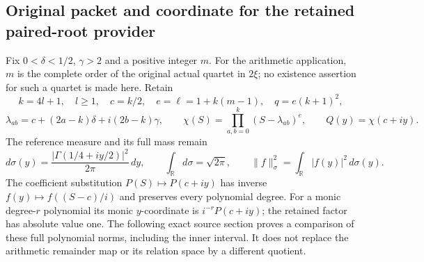 \subsection{Original packet and coordinate for the retained paired-root provider}
Fix $0<\delta<1/2$, $\gamma>2$ and a positive integer $m$.
For the arithmetic application, $m$ is the complete order of the
original actual quartet in $2\xi$; no existence assertion for such a
quartet is made here. Retain
\[
 k=4l+1,\quad l\ge1,\quad c=k/2,\quad
 e=\ell=1+k(m-1),\quad q=e(k+1)^2,
\]
\[
 \lambda_{ab}=c+(2a-k)\delta+i(2b-k)\gamma,\qquad
 \chi(S)=\prod_{a,b=0}^{k}(S-\lambda_{ab})^e,\qquad
 Q(y)=\chi(c+iy).
\]
The reference measure and its full mass remain
\[
 d\sigma(y)=\frac{|\Gamma(1/4+iy/2)|^2}{2\pi}\,dy,
 \qquad \int_{\mathbb R}d\sigma=\sqrt{2\pi},\qquad
 \|f\|_\sigma^2=\int_{\mathbb R}|f(y)|^2\,d\sigma(y).
\]
The coefficient substitution $P(S)\mapsto P(c+iy)$ has inverse
$f(y)\mapsto f((S-c)/i)$ and preserves every polynomial degree.
For a monic degree-$r$ polynomial its monic $y$-coordinate is
$i^{-r}P(c+iy)$; the retained factor has absolute value one.
The following exact source section proves a comparison of these full
polynomial norms, including the inner interval. It does not replace
the arithmetic remainder map or its relation space by a different quotient.
